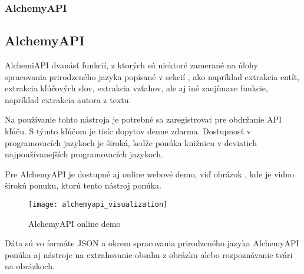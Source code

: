 %
%
{
	\subsubsection{AlchemyAPI}
}
{
	\subsection{AlchemyAPI}
}
\label{subsubsec:alchemyapi}
AlchemiAPI dvanásť funkcií, z ktorých sú niektoré zamerané na úlohy spracovania prirodzeného jazyka popísané v sekcií , ako napríklad extrakcia entít, extrakcia kľúčových slov, extrakcia vzťahov, ale aj iné zaujímave funkcie, napríklad extrakcia autora z textu.

Na používanie tohto nástroja je potrebné sa zaregistrovať pre obdržanie API kľúču. S týmto kľúčom je tisíc dopytov denne zdarma. Dostupnosť v programovacích jazykoch je široká, kedže ponúka knižnicu v deviatich najpoužívanejších programovacích jazykoch.

Pre AlchemyAPI je dostupné aj online webové demo, viď obrázok , kde je vidno širokú ponuku, ktorú tento nástroj ponúka.

\begin{figure}[H]
\begin{center}\texttt{[image: alchemyapi\_visualization]}\end{center}
\caption[AlchemyAPI online demo]{AlchemyAPI online demo}\label{fig:alchemyapi_visualization}
\end{figure}

Dáta sú vo formáte JSON a okrem spracovania prirodzeného jazyka AlchemyAPI ponúka aj nástroje na extrahovanie obsahu z obrázku alebo rozpoznávanie tvári na obrázkoch.

